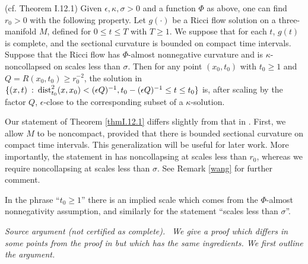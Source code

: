 \begin{theorem}
  \label{thm:kl-canonical-neighborhood-theorem-compactness-canonical-neighborhoods}
 (cf. Theorem I.12.1) \label{thmI.12.1}
Given $\epsilon, \kappa, \sigma > 0$ and a function $\Phi$ as above, one can
find $r_0 > 0$ with the following property.  Let $g(\cdot)$ be a Ricci flow
solution on a three-manifold $M$, defined for $0 \le t \le T$ with
$T \ge 1$. We suppose that for each $t$, $g(t)$ is complete,
and the sectional curvature is bounded on compact time intervals.
Suppose that the Ricci flow has
$\Phi$-almost nonnegative curvature and is $\kappa$-noncollapsed
on scales less than $\sigma$. Then for any point $(x_0, t_0)$ with $t_0 \ge 1$
and $Q = R(x_0, t_0) \ge r_0^{-2}$, the solution in
$\{(x,t) \: : \: \operatorname{dist}_{t_0}^2(x, x_0) < (\epsilon Q)^{-1}, t_0 - (\epsilon Q)^{-1}
\le t \le t_0\}$ is, after scaling by the factor $Q$, $\epsilon$-close to the
corresponding subset of a $\kappa$-solution.
\end{theorem}

\begin{remark}
  \label{rem:kl-canonical-neighborhood-theorem-existence-canonical-neighborhoods-5}
 \label{wangg}
Our statement of Theorem \ref{thmI.12.1} differs slightly from that
in \cite[Theorem 12.1]{Perelman}.
First, we allow $M$ to be noncompact, provided that
there is bounded sectional curvature on compact time intervals.
This generalization will be useful for later work.
More importantly, the statement in \cite[Theorem 12.1]{Perelman}
has noncollapsing at scales less than $r_0$, whereas we require
noncollapsing at scales less than $\sigma$. See Remark \ref{wang} for further
comment.

In the phrase ``$t_0 \ge 1$'' there is an implied scale which comes
from the $\Phi$-almost nonnegativity assumption, and similarly for the
statement  ``scales less than $\sigma$''.
\end{remark}
\par\medskip\noindent\textit{Source argument (not certified as complete).}\ \begingroup\itshape
We give a proof which differs in some points from the proof in
\cite{Perelman} but which has the same ingredients. We first outline
the argument.

